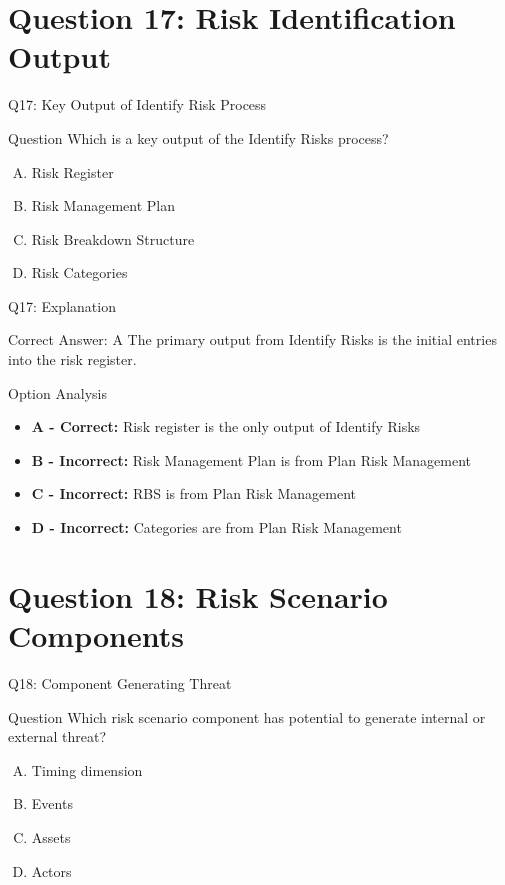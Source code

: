 \documentclass{beamer}
\begin{document}
	\section{Question 17: Risk Identification Output}
	
	\begin{frame}{Q17: Key Output of Identify Risk Process}
		\begin{block}{Question}
			Which is a key output of the Identify Risks process?
		\end{block}
		\begin{enumerate}[(A)]
			\item Risk Register
			\item Risk Management Plan
			\item Risk Breakdown Structure
			\item Risk Categories
		\end{enumerate}
	\end{frame}
	
	\begin{frame}{Q17: Explanation}
		\begin{block}{Correct Answer: A}
			The primary output from Identify Risks is the initial entries into the risk register.
		\end{block}
		\begin{block}{Option Analysis}
			\begin{itemize}
				\item \textbf{A - Correct:} Risk register is the only output of Identify Risks
				\item \textbf{B - Incorrect:} Risk Management Plan is from Plan Risk Management
				\item \textbf{C - Incorrect:} RBS is from Plan Risk Management
				\item \textbf{D - Incorrect:} Categories are from Plan Risk Management
			\end{itemize}
		\end{block}
	\end{frame}
	
	\section{Question 18: Risk Scenario Components}
	
	\begin{frame}{Q18: Component Generating Threat}
		\begin{block}{Question}
			Which risk scenario component has potential to generate internal or external threat?
		\end{block}
		\begin{enumerate}[(A)]
			\item Timing dimension
			\item Events
			\item Assets
			\item Actors
		\end{enumerate}
	\end{frame}
	
\end{document}
